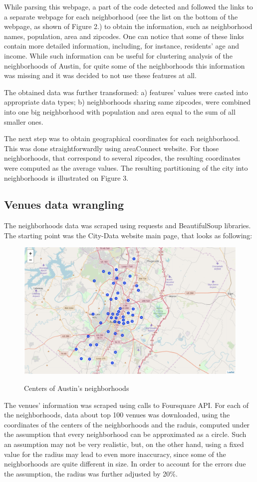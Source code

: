 \documentclass[11pt]{article}
\numberwithin{equation}{section}
\begin{document}
While parsing this webpage, a part of the code detected and followed the links to a separate webpage for each neighborhood (see the list on the bottom of the webpage, as shown of Figure 2.) to obtain the information, such as neighborhood names, population, area and zipcodes. One can notice that some of these links contain more detailed information, including, for instance, residents' age and income. While such information can be useful for clustering analysis of the neighborhoods of Austin, for quite some of the neighborhoods this information was missing and it was decided to not use these features at all.

The obtained data was further transformed: a) features' values were casted into appropriate data types; b) neighborhoods sharing same zipcodes, were combined into one big neighborhood with population and area equal to the sum of all smaller ones.

The next step was to obtain geographical coordinates for each neighborhood. This was done straightforwardly using areaConnect website. For those neighborhoods, that correspond to several zipcodes, the resulting coordinates were computed as the average values. The resulting partitioning of the city into neighborhoods is illustrated on Figure 3.
%
\subsection{Venues data wrangling}
The neighborhoods data was scraped using requests and BeautifulSoup libraries. The starting point was the City-Data website main page, that looks as following:
\begin{figure}[H]
	\centering
	\includegraphics[width=.6\textwidth]{pics/neighborhoods}
		\label{fig:1_1}
	\caption{Centers of Austin's neighborhoods}
	\label{fig:4}
\end{figure}


The venues' information was scraped using calls to Foursquare API. For each of the neighborhoods, data about top 100 venues was downloaded, using the coordinates of the centers of the neighborhoods and the raduis, computed under the assumption that every neighborhood can be approximated as a circle. Such an assumption may not be very realistic, but, on the other hand, using a fixed value for the radius may lead to even more inaccuracy, since some of the neighborhoods are quite different in size. In order to account for the errors due the assumption, the radius was further adjusted by 20\%.
\end{document}
